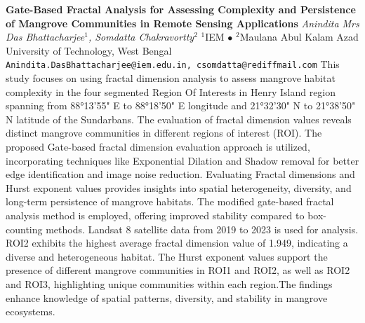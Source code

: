 
    \begin{conf-abstract}[]
        {\textbf{Gate-Based Fractal Analysis for Assessing Complexity and Persistence of Mangrove Communities in Remote Sensing Applications}}
        {\textit{Anindita Mrs Das Bhattacharjee$^{1}$, Somdatta  Chakravortty$^{2}$}}
        {$^{1}$IEM $\bullet$ $^{2}$Maulana Abul Kalam Azad University of Technology, West Bengal}
        {\texttt{Anindita.DasBhattacharjee@iem.edu.in, csomdatta@rediffmail.com}}
        {This study focuses on using fractal dimension analysis to assess mangrove habitat complexity in the four segmented Region Of Interests in Henry Island region spanning from 88°13'55" E to 88°18'50" E longitude and 21°32'30" N to 21°38'50" N latitude of the Sundarbans. The evaluation of fractal dimension values reveals distinct mangrove communities in different regions of interest (ROI). The proposed Gate-based fractal dimension evaluation approach is utilized, incorporating techniques like Exponential Dilation and Shadow removal for better edge identification and image noise reduction. Evaluating Fractal dimensions and Hurst exponent values provides insights into spatial heterogeneity, diversity, and long-term persistence of mangrove habitats. The modified gate-based fractal analysis method is employed, offering improved stability compared to box-counting methods. Landsat 8 satellite data from 2019 to 2023 is used for analysis. ROI2 exhibits the highest average fractal dimension value of 1.949, indicating a diverse and heterogeneous habitat. The Hurst exponent values support the presence of different mangrove communities in ROI1 and ROI2, as well as ROI2 and ROI3, highlighting unique communities within each region.The findings enhance knowledge of spatial patterns, diversity, and stability in mangrove ecosystems.}
    \end{conf-abstract}
        
